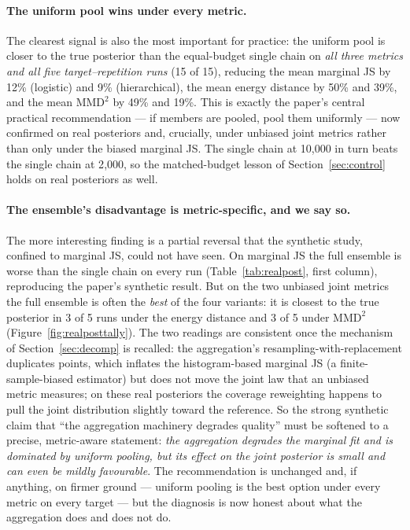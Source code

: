 \documentclass[11pt]{article}
\begin{document}
\paragraph{The uniform pool wins under every metric.} The clearest signal is
also the most important for practice: the uniform pool is closer to the true
posterior than the equal-budget single chain on \emph{all three metrics and all
five target--repetition runs} (15 of 15), reducing the mean marginal JS by 12\% (logistic)
and 9\% (hierarchical), the mean energy distance by 50\% and 39\%, and the
mean $\mathrm{MMD}^2$ by 49\% and 19\%. This is exactly the paper's central
practical recommendation --- if members are pooled, pool them uniformly ---
now confirmed on real posteriors and, crucially, under unbiased joint metrics
rather than only under the biased marginal JS. The single chain at 10{,}000
in turn beats the single chain at 2{,}000, so the matched-budget lesson of
Section~\ref{sec:control} holds on real posteriors as well.

\paragraph{The ensemble's disadvantage is metric-specific, and we say so.}
The more interesting finding is a partial reversal that the synthetic study,
confined to marginal JS, could not have seen. On marginal JS the full ensemble
is worse than the single chain on every run (Table~\ref{tab:realpost}, first
column), reproducing the paper's synthetic result. But on the two unbiased
joint metrics the full ensemble is often the \emph{best} of the four variants:
it is closest to the true posterior in 3 of 5 runs under the energy distance
and 3 of 5 under $\mathrm{MMD}^2$ (Figure~\ref{fig:realposttally}). The two
readings are consistent once the mechanism of Section~\ref{sec:decomp} is
recalled: the aggregation's resampling-with-replacement duplicates points,
which inflates the histogram-based marginal JS (a finite-sample-biased
estimator) but does not move the joint law that an unbiased metric measures; on
these real posteriors the coverage reweighting happens to pull the joint
distribution slightly toward the reference. So the strong synthetic claim
that ``the aggregation machinery degrades quality'' must be softened to a
precise, metric-aware statement: \emph{the aggregation degrades the marginal
fit and is dominated by uniform pooling, but its effect on the joint posterior
is small and can even be mildly favourable}. The recommendation is unchanged
and, if anything, on firmer ground --- uniform pooling is the best option
under every metric on every target --- but the diagnosis is now honest about
what the aggregation does and does not do.
\end{document}

